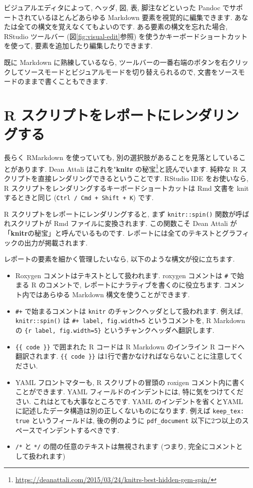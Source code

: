 \documentclass[
  11pt,
  lualatex,
  ja=standard]{bxjsreport}
\renewcommand{\href}[2]{#2\footnote{\url{#1}}}
\begin{document}
ビジュアルエディタによって, ヘッダ, 図, 表, 脚注などといった Pandoc でサポートされているほとんどあらゆる Markdown 要素を視覚的に編集できます. あなたは全ての構文を覚えなくてもよいのです. ある要素の構文を忘れた場合, RStudio ツールバー (図\ref{fig:visual-edit}参照) を使うかキーボードショートカットを使って, 要素を追加したり編集したりできます.

既に Markdown に熟練しているなら, ツールバーの一番右端のボタンを右クリックしてソースモードとビジュアルモードを切り替えられるので, 文書をソースモードのままで書くこともできます.

\hypertarget{spin}{%
\section{R スクリプトをレポートにレンダリングする}\label{spin}}

長らく RMarkdown を使っていても, 別の選択肢があることを見落としていることがあります. Dean Attali はこれを\href{https://deanattali.com/2015/03/24/knitrs-best-hidden-gem-spin/}{"\textbf{knitr} の秘宝}と読んでいます. 純粋な R スクリプトを直接レンダリングできるということです. RStudio IDE をお使いなら, R スクリプトをレンダリングするキーボードショートカットは Rmd 文書を knit するときと同じ (\texttt{Ctrl / Cmd + Shift + K}) です.

R スクリプトをレポートにレンダリングすると, まず \texttt{knitr::spin()} 関数が呼ばれスクリプトが Rmd ファイルに変換されます. この関数こそ Dean Attali が「\textbf{knitr}の秘宝」と呼んでいるものです. レポートには全てのテキストとグラフィックの出力が掲載されます.

レポートの要素を細かく管理したいなら, 以下のような構文が役に立ちます.

\begin{itemize}
\item
  Roxygen コメントはテキストとして扱われます. roxygen コメントは \texttt{\#\textquotesingle{}} で始まる R のコメントで, レポートにナラティブを書くのに役立ちます. コメント内ではあらゆる Markdown 構文を使うことができます.
\item
  \texttt{\#+} で始まるコメントは \texttt{knitr} のチャンクヘッダとして扱われます. 例えば, \texttt{knitr::spin()} は \texttt{\#+ label, fig.width=5} というコメントを, R Markdown の \texttt{\textasciigrave{}\textasciigrave{}\textasciigrave{}\{r\ label,\ fig.width=5\}} というチャンクヘッダへ翻訳します.
\item
  \texttt{\{\{ code \}\}} で囲まれた R コードは R Markdown のインライン R コードへ翻訳されます. \texttt{\{\{ code \}\}} は1行で書かなければならないことに注意してください.
\item
  YAML フロントマターも, R スクリプトの冒頭の roxigen コメント内に書くことができます. YAML フィールドのインデントには, 特に気をつけてください. これはとても大事なところです. YAML のインデントを省くとYAMLに記述したデータ構造は別の正しくないものになります. 例えば \texttt{keep\_tex: true} というフィールドは, 後の例のように \texttt{pdf\_document} 以下に2つ以上のスペースでインデントするべきです.
\item
  \texttt{/*} と \texttt{*/} の間の任意のテキストは無視されます (つまり, 完全にコメントとして扱われます)
\end{itemize}
\end{document}
